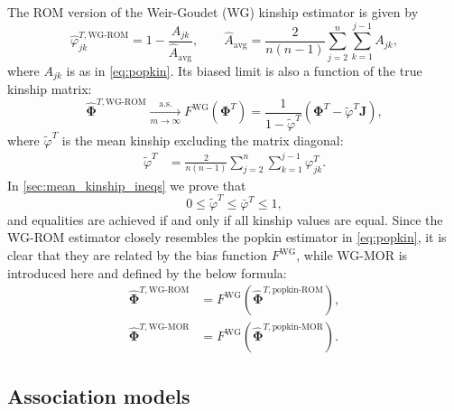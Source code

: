 \documentclass[9pt,twocolumn,twoside]{gsajnl}
\newcommand{\kt}[1][k]{\varphi_{j#1}^T}
\newcommand{\ktHatNamed}[2][k]{\hat{\varphi}_{j#1}^{T,\text{#2}}}
\newcommand{\kinMat}[1][T]{\mathbf{\Phi}^{#1}}
\newcommand{\kinMatEstNamed}[1]{\mathbf{\hat{\Phi}}^{T,\text{#1}}}
\newcommand{\Ajk}[1][k]{A_{j#1}}
\newcommand{\AAvgHat}{\hat{A}_{\text{avg}}}
\newcommand{\toas}{\xrightarrow[m \rightarrow \infty]{\text{a.s.}}}
\begin{document}
The ROM version of the Weir-Goudet (WG) kinship estimator is given by \citep{weir_unified_2017, ochoa_estimating_2021}
\begin{equation}
  \label{eq:wg}
  \ktHatNamed{WG-ROM}
  =
  1 - \frac{\Ajk}{\AAvgHat}
  , \quad\quad
  \AAvgHat
  =
  \frac{2}{n(n-1)}
  \sum_{j=2}^n
  \sum_{k=1}^{j-1}
    \Ajk
    ,
\end{equation}
where $\Ajk$ is as in \cref{eq:popkin}.
Its biased limit is also a function of the true kinship matrix:
\begin{equation}
  \label{eq:wg_lim}
  \kinMatEstNamed{WG-ROM}
  \toas
  F^\text{WG} \left( \kinMat \right)
  =
  \frac{1}{1 - \tilde{\varphi}^T}
  \left( \kinMat - \tilde{\varphi}^T \mathbf{J} \right)
  ,
\end{equation}
where $\tilde{\varphi}^T$ is the mean kinship excluding the matrix diagonal:
\begin{equation}
  \label{eq:wg_tilde}
  \begin{split}
    \tilde{\varphi}^T
    &=
    \frac{2}{n(n-1)}
    \sum_{j=2}^n
    \sum_{k=1}^{j-1}
    \kt
    .
  \end{split}
\end{equation}
In \cref{sec:mean_kinship_ineqs} we prove that
$$
0 \le \tilde{\varphi}^T \le \bar{\varphi}^T \le 1,
$$
and equalities are achieved if and only if all kinship values are equal.
Since the WG-ROM estimator closely resembles the popkin estimator in \cref{eq:popkin}, it is clear that they are related by the bias function $F^\text{WG}$, while WG-MOR is introduced here and defined by the below formula:
\begin{align*}
  \kinMatEstNamed{WG-ROM}
  &=
    F^\text{WG} \left( \kinMatEstNamed{popkin-ROM} \right)
    , \\
  \kinMatEstNamed{WG-MOR}
  &=
    F^\text{WG} \left( \kinMatEstNamed{popkin-MOR} \right)
  .
\end{align*}

\subsection{Association models}
\end{document}
